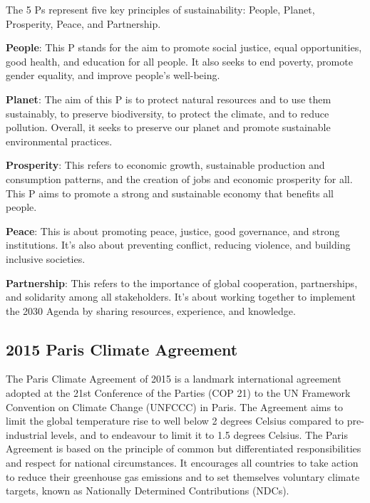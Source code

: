 \documentclass[
  a4paper,
  DIV=11,
  numbers=noendperiod,
  oneside,
  openany]{scrreprt}
\begin{document}
\begin{tcolorbox}[enhanced jigsaw, arc=.35mm, bottomrule=.15mm, bottomtitle=1mm, breakable, colback=white, colbacktitle=quarto-callout-note-color!10!white, colframe=quarto-callout-note-color-frame, coltitle=black, left=2mm, leftrule=.75mm, opacityback=0, opacitybacktitle=0.6, rightrule=.15mm, title={The 5 Ps of the SDGs}, titlerule=0mm, toprule=.15mm, toptitle=1mm]

The 5 Ps represent five key principles of sustainability: People,
Planet, Prosperity, Peace, and Partnership.

\textbf{People}: This P stands for the aim to promote social justice,
equal opportunities, good health, and education for all people. It also
seeks to end poverty, promote gender equality, and improve people's
well-being.

\textbf{Planet}: The aim of this P is to protect natural resources and
to use them sustainably, to preserve biodiversity, to protect the
climate, and to reduce pollution. Overall, it seeks to preserve our
planet and promote sustainable environmental practices.

\textbf{Prosperity}: This refers to economic growth, sustainable
production and consumption patterns, and the creation of jobs and
economic prosperity for all. This P aims to promote a strong and
sustainable economy that benefits all people.

\textbf{Peace}: This is about promoting peace, justice, good governance,
and strong institutions. It's also about preventing conflict, reducing
violence, and building inclusive societies.

\textbf{Partnership}: This refers to the importance of global
cooperation, partnerships, and solidarity among all stakeholders. It's
about working together to implement the 2030 Agenda by sharing
resources, experience, and knowledge.

\end{tcolorbox}

\subsection{2015 Paris Climate Agreement}\label{paris-climate-agreement}

The Paris Climate Agreement of 2015 is a landmark international
agreement adopted at the 21st Conference of the Parties (COP 21) to the
UN Framework Convention on Climate Change (UNFCCC) in Paris. The
Agreement aims to limit the global temperature rise to well below 2
degrees Celsius compared to pre-industrial levels, and to endeavour to
limit it to 1.5 degrees Celsius. The Paris Agreement is based on the
principle of common but differentiated responsibilities and respect for
national circumstances. It encourages all countries to take action to
reduce their greenhouse gas emissions and to set themselves voluntary
climate targets, known as Nationally Determined Contributions (NDCs).
\end{document}
